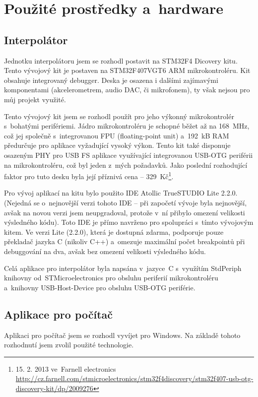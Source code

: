 \chapter{Použité prostředky a~hardware}\label{kap:prostredky}
	\section{Interpolátor}
	
	Jednotku interpolátoru jsem se rozhodl postavit na STM32F4 Dicovery kitu. Tento vývojový kit je postaven na STM32F407VGT6 ARM mikrokontroléru\cite{discovery}. Kit obsahuje integrovaný debugger. Deska je osazena i dalšími zajímavými komponentami (akcelerometrem, audio DAC, či mikrofonem), ty však nejsou pro můj projekt využité.
	
	Tento vývojový kit jsem se rozhodl použít pro jeho výkonný mikrokontrolér s~bohatými perifériemi. Jádro mikrokontroléru je schopné běžet až na 168~MHz, což jej společně s~integrovanou FPU (floating-point unit) a~192~kB RAM předurčuje pro aplikace vyžadující vysoký výkon. Tento kit také disponuje osazeným PHY pro USB FS aplikace využívající integrovanou USB-OTG periférii na mikrokontroléru, což byl jeden z~mých požadavků. Jako poslední rozhodující faktor pro tuto desku byla její příznivá cena -- 329~Kč\footnote{15. 2. 2013 ve~Farnell electronics \url{http://cz.farnell.com/stmicroelectronics/stm32f4discovery/stm32f407-usb-otg-discovery-kit/dp/2009276}}. 
	
	Pro vývoj aplikací na kitu bylo použito IDE Atollic TrueSTUDIO Lite 2.2.0. (Nejedná se o~nejnovější verzi tohoto IDE -- při započetí vývoje byla nejnovější, avšak na novou verzi jsem neupgradoval, protože v~ní přibylo omezení velikosti výsledného kódu). Toto IDE je přímo navrženo pro spolupráci s~tímto vývojovým kitem. Ve verzi Lite (2.2.0), která je dostupná zdarma, podporuje pouze překladač jazyka C (nikoliv C++) a~omezuje maximální počet breakpointů při debuggování na dva, avšak bez omezení velikosti výsledného kódu.
	
	Celá aplikace pro interpolátor byla napsána v~jazyce~C s~využítím StdPeriph knihovny od~STMicroelectronics pro obsluhu periferií mikrokontroléru a~knihovny USB-Host-Device pro obsluhu USB-OTG periférie.
	
	\section{Aplikace pro počítač}
	
	Aplikaci pro počítač jsem se rozhodl vyvíjet pro Windows. Na základě tohoto rozhodnutí jsem zvolil použité technologie.
	
